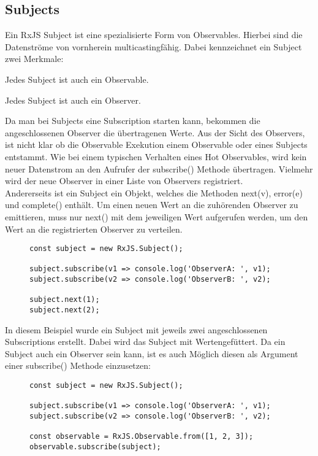 \subsection{Subjects}

Ein RxJS Subject ist eine spezialisierte Form von Observables. Hierbei sind die Datenströme von vornherein multicastingfähig. Dabei kennzeichnet ein Subject zwei Merkmale:

\begin{description}
\item Jedes Subject ist auch ein Observable.
\item Jedes Subject ist auch ein Observer.
\end{description}

\noindent
Da man bei Subjects eine Subscription starten kann, bekommen die angeschlossenen Observer die übertragenen Werte. Aus der Sicht des Observers, ist nicht klar ob die Observable Exekution einem Observable oder eines Subjects entstammt. Wie bei einem typischen Verhalten eines Hot Observables, wird kein neuer Datenstrom an den Aufrufer der subscribe() Methode übertragen. Vielmehr wird der neue Observer in einer Liste von Observers registriert.\\

\noindent
Andererseits ist ein Subject ein Objekt, welches die Methoden next(v), error(e) und complete() enthält. Um einen neuen Wert an die zuhörenden Observer zu emittieren, muss nur next() mit dem jeweiligen Wert aufgerufen werden, um den Wert an die registrierten Observer zu verteilen.

\begin{figure}[H]
\begin{lstlisting}[basicstyle=\small]
const subject = new RxJS.Subject();

subject.subscribe(v1 => console.log('ObserverA: ', v1);
subject.subscribe(v2 => console.log('ObserverB: ', v2);

subject.next(1);
subject.next(2);
\end{lstlisting}
\end{figure}

\noindent
In diesem Beispiel wurde ein Subject mit jeweils zwei angeschlossenen Subscriptions erstellt. Dabei wird das Subject mit Werten\glqq gefüttert\grqq. Da ein Subject auch ein Observer sein kann, ist es auch Möglich diesen als Argument einer subscribe() Methode einzusetzen:

\begin{figure}[H]
\begin{lstlisting}[basicstyle=\small]
const subject = new RxJS.Subject();

subject.subscribe(v1 => console.log('ObserverA: ', v1);
subject.subscribe(v2 => console.log('ObserverB: ', v2);

const observable = RxJS.Observable.from([1, 2, 3]);
observable.subscribe(subject);
\end{lstlisting}
\end{figure}

